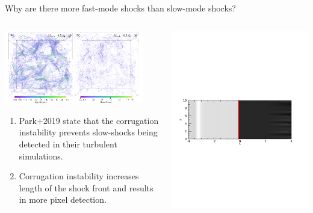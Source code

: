 \documentclass[10pt,aspectratio=169,usenames,dvipsnames]{beamer}
\begin{document}
\begin{frame}{Why are there more fast-mode shocks than slow-mode shocks?}
\begin{columns}
\begin{column}{0.5\textwidth}
\includegraphics[width=0.9\textwidth]{2023AAPPS-DPP/Figures/park2019shocks.png}
\begin{enumerate}
    \item Park+2019 state that the corrugation instability prevents slow-shocks being detected in their turbulent simulations.
    \item Corrugation instability increases length of the shock front and results in more pixel detection.
\end{enumerate}
\end{column}
\begin{column}{0.5\textwidth}
\includegraphics[width=0.95\linewidth,clip=true,trim=1.0cm 10.0cm 2.5cm 10.0cm]{2023AAPPS-DPP/Figures/shockstabtest5.pdf} \\

\end{column}
\end{columns}
\end{frame}
\end{document}
